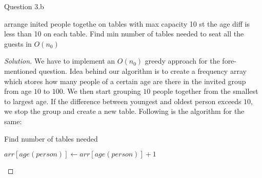 \begin{solution}{Question 3.b}
    \begin{question}[]
        arrange inited people togethe on tables with max capacity 10 st the age diff is less than 10 on each table. Find min number of tables needed to seat all the guests in $O(n_0)$
    \end{question}
    \tcblower{}
    \begin{proof}[Solution]
        We have to implement an $O(n_0)$ greedy approach for the fore-mentioned question. Idea behind our algorithm is to create a frequency array which stores how many people of a certain age are there in the invited group from age $10$ to $100$. We then start grouping $10$ people together from the smallest to largest age. If the difference between youngest and oldest person exceeds $10$, we stop the group and create a new table. Following is the algorithm for the same:
        \begin{algorithm}[H]
            \caption{Find number of tables needed}
            \begin{algorithmic}[1]
                 
                 
                    \State $arr[age(person)]\gets arr[age(person)]+1$
                \EndFor
                 
                     
                    \EndIf{}
                     
                     
                     

\end{algorithmic}
\end{algorithm}
\end{proof}
\end{solution}
